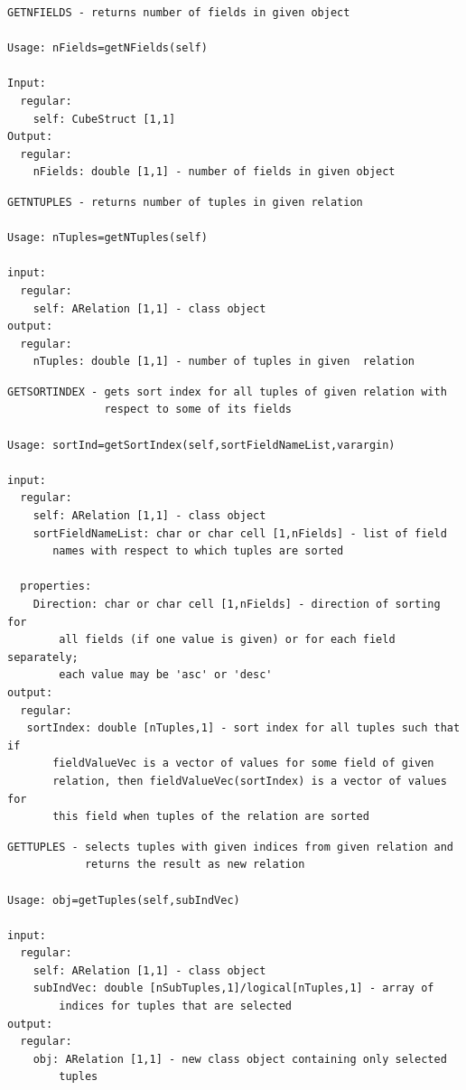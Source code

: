 \documentclass[letterpaper,10pt,english]{sphinxmanual}
\begin{document}
\label{chap_func:smartdb-relations-atypifiedstaticrelation-getnfields}
\begin{Verbatim}[commandchars=\\\{\}]
GETNFIELDS - returns number of fields in given object

Usage: nFields=getNFields(self)

Input:
  regular:
    self: CubeStruct [1,1]
Output:
  regular:
    nFields: double [1,1] - number of fields in given object
\end{Verbatim}
\label{chap_func:smartdb-relations-atypifiedstaticrelation-getntuples}
\begin{Verbatim}[commandchars=\\\{\}]
GETNTUPLES - returns number of tuples in given relation

Usage: nTuples=getNTuples(self)

input:
  regular:
    self: ARelation [1,1] - class object
output:
  regular:
    nTuples: double [1,1] - number of tuples in given  relation
\end{Verbatim}
\label{chap_func:smartdb-relations-atypifiedstaticrelation-getsortindex}
\begin{Verbatim}[commandchars=\\\{\}]
GETSORTINDEX - gets sort index for all tuples of given relation with
               respect to some of its fields

Usage: sortInd=getSortIndex(self,sortFieldNameList,varargin)

input:
  regular:
    self: ARelation [1,1] - class object
    sortFieldNameList: char or char cell [1,nFields] - list of field
       names with respect to which tuples are sorted

  properties:
    Direction: char or char cell [1,nFields] - direction of sorting for
        all fields (if one value is given) or for each field separately;
        each value may be 'asc' or 'desc'
output:
  regular:
   sortIndex: double [nTuples,1] - sort index for all tuples such that if
       fieldValueVec is a vector of values for some field of given
       relation, then fieldValueVec(sortIndex) is a vector of values for
       this field when tuples of the relation are sorted
\end{Verbatim}
\label{chap_func:smartdb-relations-atypifiedstaticrelation-gettuples}
\begin{Verbatim}[commandchars=\\\{\}]
GETTUPLES - selects tuples with given indices from given relation and
            returns the result as new relation

Usage: obj=getTuples(self,subIndVec)

input:
  regular:
    self: ARelation [1,1] - class object
    subIndVec: double [nSubTuples,1]/logical[nTuples,1] - array of
        indices for tuples that are selected
output:
  regular:
    obj: ARelation [1,1] - new class object containing only selected
        tuples
\end{Verbatim}
\end{document}
